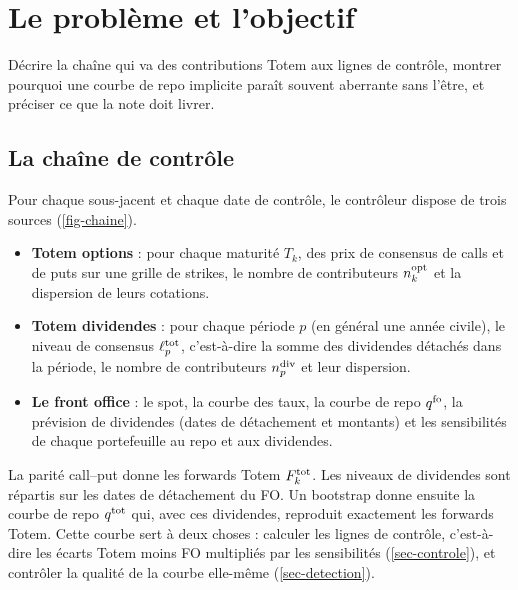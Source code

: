 \section{Le problème et l'objectif}\label{sec-probleme}

\begin{objectif}
Décrire la chaîne qui va des contributions Totem aux lignes de contrôle, montrer pourquoi une courbe de repo implicite
paraît souvent aberrante sans l'être, et préciser ce que la note doit livrer.
\end{objectif}

\subsection{La chaîne de contrôle}
Pour chaque sous-jacent et chaque date de contrôle, le contrôleur dispose de trois sources (\cref{fig-chaine}).
\begin{itemize}
\item \textbf{Totem options} : pour chaque maturité $T_k$, des prix de consensus de calls et de puts sur une grille
de strikes, le nombre de contributeurs $n^{\mathrm{opt}}_k$ et la dispersion de leurs cotations.
\item \textbf{Totem dividendes} : pour chaque période $p$ (en général une année civile), le niveau de consensus
$\ell^{\mathrm{tot}}_p$, c'est-à-dire la somme des dividendes détachés dans la période, le nombre de contributeurs
$n^{\mathrm{div}}_p$ et leur dispersion.
\item \textbf{Le front office} : le spot, la courbe des taux, la courbe de repo $q^{\mathrm{fo}}$, la prévision de dividendes
(dates de détachement et montants) et les sensibilités de chaque portefeuille au repo et aux dividendes.
\end{itemize}
La parité call--put donne les forwards Totem $F^{\mathrm{tot}}_k$. Les niveaux de dividendes sont répartis sur les dates de
détachement du FO. Un bootstrap donne ensuite la courbe de repo $q^{\mathrm{tot}}$ qui, avec ces dividendes, reproduit
exactement les forwards Totem. Cette courbe sert à deux choses : calculer les lignes de contrôle, c'est-à-dire les
écarts Totem moins FO multipliés par les sensibilités (\cref{sec-controle}), et contrôler la qualité de la courbe
elle-même (\cref{sec-detection}).

